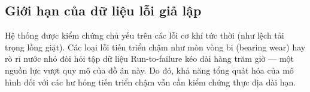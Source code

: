 \subsection{Giới hạn của dữ liệu lỗi giả lập}

Hệ thống được kiểm chứng chủ yếu trên các lỗi cơ khí tức thời (như lệch tải trọng lồng giặt). Các loại lỗi tiến triển chậm như mòn vòng bi (bearing wear) hay rò rỉ nước nhỏ đòi hỏi tập dữ liệu Run-to-failure kéo dài hàng trăm giờ — một nguồn lực vượt quy mô của đồ án này. Do đó, khả năng tổng quát hóa của mô hình đối với các hư hỏng tiến triển chậm vẫn cần kiểm chứng thực địa dài hạn.
